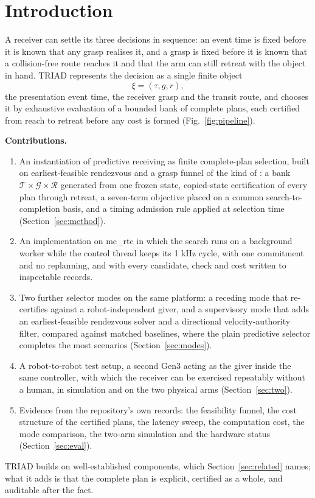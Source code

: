 \documentclass[conference]{IEEEtran}
\begin{document}
\section{Introduction}\label{sec:intro}
A receiver can settle its three decisions in sequence: an event time is fixed before it is known that any grasp realises it, and a grasp is fixed before it is known that a collision-free route reaches it and that the arm can still retreat with the object in hand. TRIAD represents the decision as a single finite object
\begin{equation}
\xi = (\tau, g, r),
\end{equation}
the presentation event time, the receiver grasp and the transit route, and chooses it by exhaustive evaluation of a bounded bank of complete plans, each certified from reach to retreat before any cost is formed (Fig.~\ref{fig:pipeline}).

\textbf{Contributions.}
\begin{enumerate}
\item An instantiation of predictive receiving as finite complete-plan selection, built on earliest-feasible rendezvous \cite{croft98,hujic98} and a grasp funnel of the kind of \cite{akinola21}: a bank $\mathcal T\times\mathcal G\times\mathcal R$ generated from one frozen state, copied-state certification of every plan through retreat, a seven-term objective placed on a common search-to-completion basis, and a timing admission rule applied at selection time (Section~\ref{sec:method}).
\item An implementation on mc\_rtc in which the search runs on a background worker while the control thread keeps its 1 kHz cycle, with one commitment and no replanning, and with every candidate, check and cost written to inspectable records.
\item Two further selector modes on the same platform: a receding mode that re-certifies against a robot-independent giver, and a supervisory mode that adds an earliest-feasible rendezvous solver and a directional velocity-authority filter, compared against matched baselines, where the plain predictive selector completes the most scenarios (Section~\ref{sec:modes}).
\item A robot-to-robot test setup, a second Gen3 acting as the giver inside the same controller, with which the receiver can be exercised repeatably without a human, in simulation and on the two physical arms (Section~\ref{sec:two}).
\item Evidence from the repository's own records: the feasibility funnel, the cost structure of the certified plans, the latency sweep, the computation cost, the mode comparison, the two-arm simulation and the hardware status (Section~\ref{sec:eval}).
\end{enumerate}
TRIAD builds on well-established components, which Section~\ref{sec:related} names; what it adds is that the complete plan is explicit, certified as a whole, and auditable after the fact.
\end{document}
